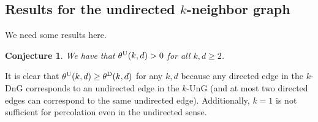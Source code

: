 \documentclass{article}
\newtheorem{conj}[theorem]{Conjecture}
\theoremstyle{definition}
\newcommand{\1}{\mathbbm{1}}
\newcommand{\0}{\mathbf{o}}
\begin{document}
\subsection{Results for the undirected $k$-neighbor graph}\label{sec:U}
We need some results here.
\begin{conj}
We have that $\theta^{\rm U}(k,d)>0$ for all $k,d\ge 2$.  
\end{conj}

\medskip

It is clear that $\theta^{\rm U}(k,d) \geq \theta^{\rm D}(k,d)$ for any $k,d$ because any directed edge in the $k$-DnG corresponds to an undirected edge in the $k$-UnG (and at most two directed edges can correspond to the same undirected edge). Additionally, $k=1$ is not sufficient for percolation even in the undirected sense.
\end{document}
